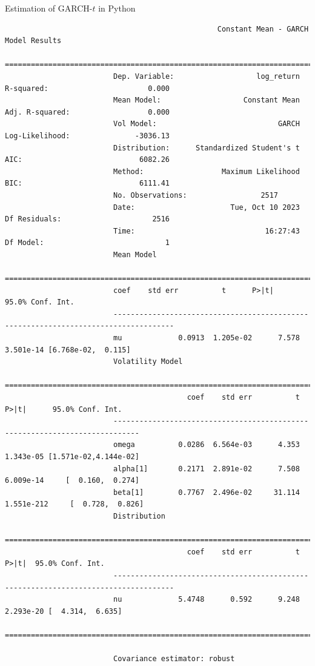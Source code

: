\begin{frame}[fragile]
\begin{block}{Estimation of GARCH-$t$ in Python}
\tiny
\begin{verbatim}
                                                 Constant Mean - GARCH Model Results
                         ====================================================================================
                         Dep. Variable:                   log_return   R-squared:                       0.000
                         Mean Model:                   Constant Mean   Adj. R-squared:                  0.000
                         Vol Model:                            GARCH   Log-Likelihood:               -3036.13
                         Distribution:      Standardized Student's t   AIC:                           6082.26
                         Method:                  Maximum Likelihood   BIC:                           6111.41
                         No. Observations:                 2517
                         Date:                      Tue, Oct 10 2023   Df Residuals:                     2516
                         Time:                              16:27:43   Df Model:                            1
                         Mean Model
                         ====================================================================================
                         coef    std err          t      P>|t|    95.0% Conf. Int.
                         ------------------------------------------------------------------------------------
                         mu             0.0913  1.205e-02      7.578  3.501e-14 [6.768e-02,  0.115]
                         Volatility Model
                         ====================================================================================
                                          coef    std err          t      P>|t|      95.0% Conf. Int.
                         ----------------------------------------------------------------------------
                         omega          0.0286  6.564e-03      4.353  1.343e-05 [1.571e-02,4.144e-02]
                         alpha[1]       0.2171  2.891e-02      7.508  6.009e-14     [  0.160,  0.274]
                         beta[1]        0.7767  2.496e-02     31.114 1.551e-212     [  0.728,  0.826]
                         Distribution
                         ====================================================================================
                                          coef    std err          t      P>|t|  95.0% Conf. Int.
                         ------------------------------------------------------------------------------------
                         nu             5.4748      0.592      9.248  2.293e-20 [  4.314,  6.635]
                         ====================================================================================

                         Covariance estimator: robust
\end{verbatim}
\end{block}
\end{frame}

